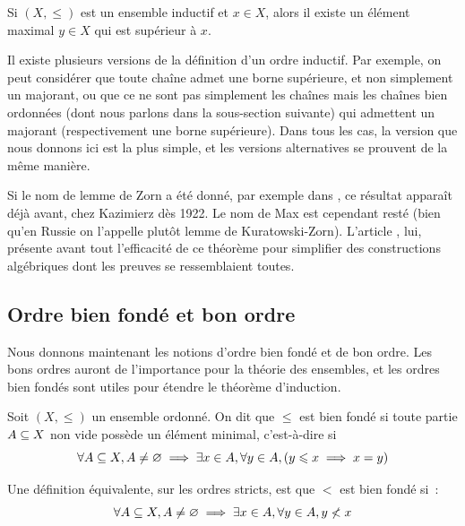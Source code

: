 \begin{theorem}\label{thm.Zorn}
  Si $(X,\leq)$ est un ensemble inductif et $x\in X$, alors il existe un élément
  maximal $y \in X$ qui est supérieur à $x$.
\end{theorem}

\begin{remark}
  Il existe plusieurs versions de la définition d'un ordre inductif. Par
  exemple, on peut considérer que toute chaîne admet une borne supérieure, et
  non simplement un majorant, ou que ce ne sont pas simplement les chaînes mais
  les chaînes bien ordonnées (dont nous parlons dans la sous-section suivante)
  qui admettent un majorant (respectivement une borne supérieure). Dans tous les
  cas, la version que nous donnons ici est la plus simple, et les versions
  alternatives se prouvent de la même manière.
\end{remark}

Si le nom de lemme de Zorn a été donné, par exemple dans \cite{Tukey1940}, ce
résultat apparaît déjà avant, chez Kazimierz  dès 1922. Le nom
de Max  est cependant resté (bien qu'en Russie on l'appelle plutôt
lemme de Kuratowski-Zorn).
L'article \cite{Zorn1935}, lui, présente avant tout l'efficacité de ce
théorème pour simplifier des constructions algébriques dont les preuves se
ressemblaient toutes.

\subsection{Ordre bien fondé et bon ordre}

Nous donnons maintenant les notions d'ordre bien fondé et de bon ordre. Les bons
ordres auront de l'importance pour la théorie des ensembles, et les ordres bien
fondés sont utiles pour étendre le théorème d'induction.

\begin{definition}\label{def.wf.ord}
  Soit $(X,\leq)$ un ensemble ordonné. On dit que $\leq$ est bien fondé si toute
  partie $A\subseteq X$ non vide possède un élément minimal, c'est-à-dire
  si
  \[\forall A \subseteq X, A\neq \varnothing \implies \exists x\in A,
  \forall y\in A, (y\leqslant x \implies x = y)\]
\end{definition}

\begin{remark}
  Une définition équivalente, sur les ordres stricts, est que $<$ est bien fondé
  si~:
  \[\forall A \subseteq X, A\neq \varnothing \implies \exists x \in A,
  \forall y \in A, y\nless x\]
\end{remark}

